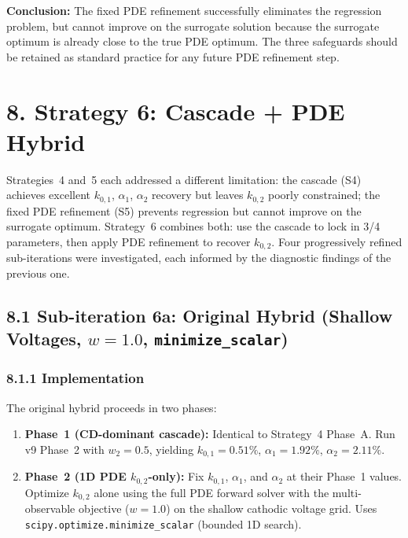 \documentclass[11pt]{article}
\begin{document}
\textbf{Conclusion:} The fixed PDE refinement successfully eliminates the
regression problem, but cannot improve on the surrogate solution because the
surrogate optimum is already close to the true PDE optimum.  The three
safeguards should be retained as standard practice for any future PDE
refinement step.


\section*{8. Strategy 6: Cascade + PDE Hybrid}\label{sec:strat6}

Strategies~4 and~5 each addressed a different limitation: the cascade (S4)
achieves excellent $k_{0,1}$, $\alpha_1$, $\alpha_2$ recovery but leaves
$k_{0,2}$ poorly constrained; the fixed PDE refinement (S5) prevents
regression but cannot improve on the surrogate optimum.  Strategy~6 combines
both: use the cascade to lock in 3/4 parameters, then apply PDE refinement
to recover $k_{0,2}$.  Four progressively refined sub-iterations were
investigated, each informed by the diagnostic findings of the previous one.

\subsection*{8.1 Sub-iteration 6a: Original Hybrid (Shallow Voltages, $w = 1.0$, \texttt{minimize\_scalar})}

\subsubsection*{8.1.1 Implementation}

The original hybrid proceeds in two phases:
\begin{enumerate}
  \item \textbf{Phase~1 (CD-dominant cascade):} Identical to Strategy~4
        Phase~A.  Run v9 Phase~2 with $w_2 = 0.5$, yielding
        $k_{0,1} = 0.51\%$, $\alpha_1 = 1.92\%$, $\alpha_2 = 2.11\%$.

  \item \textbf{Phase~2 (1D PDE $k_{0,2}$-only):} Fix $k_{0,1}$, $\alpha_1$,
        and $\alpha_2$ at their Phase~1 values.  Optimize $k_{0,2}$ alone using
        the full PDE forward solver with the multi-observable objective
        ($w = 1.0$) on the shallow cathodic voltage grid.  Uses
        \texttt{scipy.optimize.minimize\_scalar} (bounded 1D search).
\end{enumerate}
\end{document}
